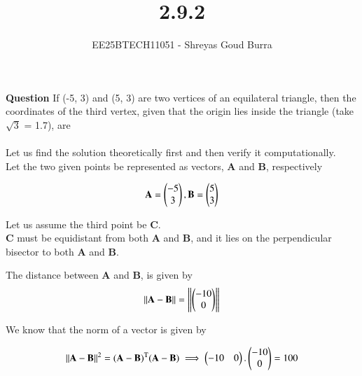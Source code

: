 \documentclass[journal]{IEEEtran}
\begin{document}

\vspace{3cm}

\title{2.9.2}
\author{EE25BTECH11051 - Shreyas Goud Burra}
\maketitle
{\let\newpage\relax\maketitle}

\renewcommand{\thefigure}{\theenumi}
\renewcommand{\thetable}{\theenumi}
\setlength{\intextsep}{10pt}


\renewcommand{\thetable}{\theenumi}

\textbf{Question}
If (-5, 3) and (5, 3) are two vertices of an equilateral triangle, then the
coordinates of the third vertex, given that the origin lies inside the triangle (take $\sqrt{3}$ = 1.7), are\\

\solution\\

Let us find the solution theoretically first and then verify it computationally.\\
Let the two given points be represented as vectors, \textbf{A} and \textbf{B}, respectively

\begin{align}
    \textbf{A} = \begin{pmatrix}-5\\3\end{pmatrix}, \textbf{B} = \begin{pmatrix}5\\3\end{pmatrix}
    \label{0.1}
\end{align}

Let us assume the third point be \textbf{C}.\\
\textbf{C} must be equidistant from both \textbf{A} and \textbf{B}, and it lies on the perpendicular bisector to both \textbf{A} and \textbf{B}.

The distance between \textbf{A} and \textbf{B}, is given by
\begin{align}
    \left\lVert\textbf{A}-\textbf{B}\right\rVert=\left\lVert\begin{pmatrix}-10\\0\end{pmatrix}\right\rVert
    \label{0.2}
\end{align}

We know that the norm of a vector is given by

\begin{align}
    \left\lVert\textbf{A}-\textbf{B}\right\rVert^2 = (\textbf{A}-\textbf{B})^\text{T}(\textbf{A}-\textbf{B}) \implies \begin{pmatrix}-10&0\end{pmatrix}.\begin{pmatrix}-10\\0\end{pmatrix}= 100
    \label{0.3}
\end{align}
\end{document}
